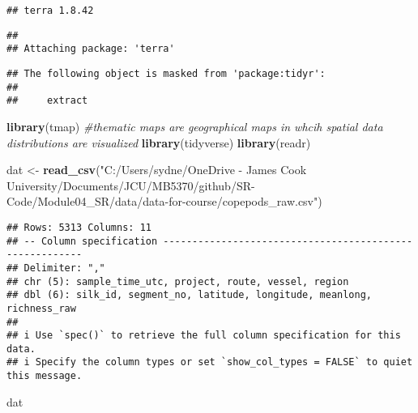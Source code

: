 \documentclass[
]{article}
\newenvironment{Shaded}{\begin{snugshade}}{\end{snugshade}}
\newcommand{\CommentTok}[1]{\textcolor[rgb]{0.56,0.35,0.01}{\textit{#1}}}
\newcommand{\FunctionTok}[1]{\textcolor[rgb]{0.13,0.29,0.53}{\textbf{#1}}}
\newcommand{\NormalTok}[1]{#1}
\newcommand{\OtherTok}[1]{\textcolor[rgb]{0.56,0.35,0.01}{#1}}
\newcommand{\StringTok}[1]{\textcolor[rgb]{0.31,0.60,0.02}{#1}}
\begin{document}
\begin{verbatim}
## terra 1.8.42
\end{verbatim}

\begin{verbatim}
## 
## Attaching package: 'terra'
\end{verbatim}

\begin{verbatim}
## The following object is masked from 'package:tidyr':
## 
##     extract
\end{verbatim}

\begin{Shaded}
\begin{Highlighting}[]
\FunctionTok{library}\NormalTok{(tmap) }\CommentTok{\#thematic maps are geographical maps in whcih spatial data distributions are visualized}
\FunctionTok{library}\NormalTok{(tidyverse)}
\FunctionTok{library}\NormalTok{(readr)}
\end{Highlighting}
\end{Shaded}

\begin{Shaded}
\begin{Highlighting}[]
\NormalTok{dat }\OtherTok{\textless{}{-}} \FunctionTok{read\_csv}\NormalTok{(}\StringTok{"C:/Users/sydne/OneDrive {-} James Cook University/Documents/JCU/MB5370/github/SR{-}Code/Module04\_SR/data/data{-}for{-}course/copepods\_raw.csv"}\NormalTok{)}
\end{Highlighting}
\end{Shaded}

\begin{verbatim}
## Rows: 5313 Columns: 11
## -- Column specification --------------------------------------------------------
## Delimiter: ","
## chr (5): sample_time_utc, project, route, vessel, region
## dbl (6): silk_id, segment_no, latitude, longitude, meanlong, richness_raw
## 
## i Use `spec()` to retrieve the full column specification for this data.
## i Specify the column types or set `show_col_types = FALSE` to quiet this message.
\end{verbatim}

\begin{Shaded}
\begin{Highlighting}[]
\NormalTok{dat}
\end{Highlighting}
\end{Shaded}
\end{document}
